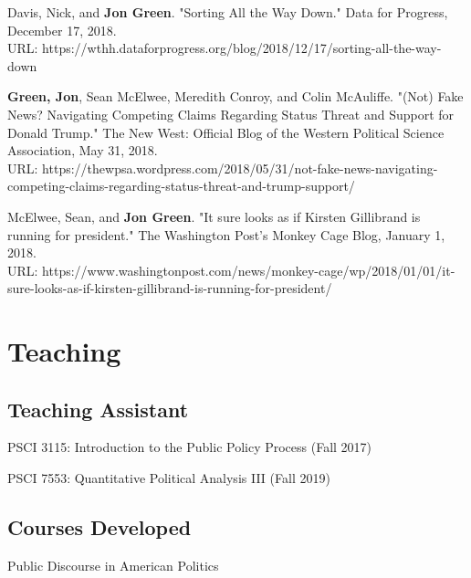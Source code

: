 \documentclass[letterpaper]{article}
\renewenvironment{itemize}{
  \begin{list}{}{
    \setlength{\leftmargin}{1.5em}
  }
}{
  \end{list}
}
\begin{document}
\begin{itemize}
\item Davis, Nick, and \textbf{Jon Green}. "Sorting All the Way Down." Data for Progress, December 17, 2018. \\
URL: https://wthh.dataforprogress.org/blog/2018/12/17/sorting-all-the-way-down

\item \textbf{Green, Jon}, Sean McElwee, Meredith Conroy, and Colin McAuliffe. "(Not) Fake News? Navigating Competing Claims Regarding Status Threat and Support for Donald Trump." The New West: Official Blog of the Western Political Science Association, May 31, 2018. \\
URL: https://thewpsa.wordpress.com/2018/05/31/not-fake-news-navigating-competing-claims-regarding-status-threat-and-trump-support/

\item McElwee, Sean, and \textbf{Jon Green}. "It sure looks as if Kirsten Gillibrand is running for president." The Washington Post's Monkey Cage Blog, January 1, 2018. \\ 
URL: https://www.washingtonpost.com/news/monkey-cage/wp/2018/01/01/it-sure-looks-as-if-kirsten-gillibrand-is-running-for-president/
\end{itemize}

\section*{Teaching}

\subsection*{Teaching Assistant}

\begin{itemize}
\item PSCI 3115: Introduction to the Public Policy Process (Fall 2017)
\item PSCI 7553: Quantitative Political Analysis III (Fall 2019) 
\end{itemize}

\subsection*{Courses Developed}

\begin{itemize}
\item Public Discourse in American Politics
\end{itemize}
\end{document}
